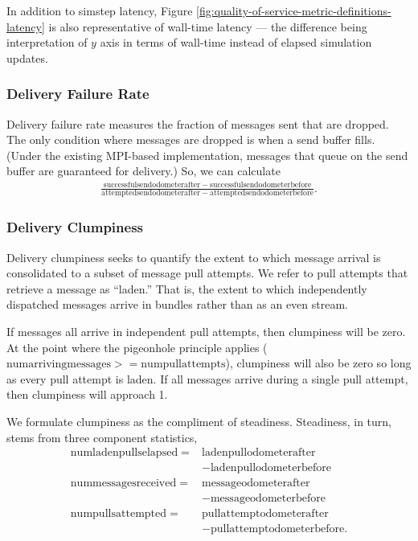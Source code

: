 In addition to simstep latency, Figure \ref{fig:quality-of-service-metric-definitions-latency} is also representative of wall-time latency --- the difference being interpretation of $y$ axis in terms of wall-time instead of elapsed simulation updates.

\subsubsection{Delivery Failure Rate} \label{sec:delivery-failure-rate-metric}

Delivery failure rate measures the fraction of messages sent that are dropped.
The only condition where messages are dropped is when a send buffer fills.
(Under the existing MPI-based implementation, messages that queue on the send buffer are guaranteed for delivery.)
So, we can calculate
\begin{align*}
  \frac{
    \mathrm{successful send odometer after} - \mathrm{successful send odometer before}
  }{
    \mathrm{attempted send odometer after} - \mathrm{attempted send odometer before}
  }.
\end{align*}

\subsubsection{Delivery Clumpiness} \label{sec:delivery-clumpiness-metric}

Delivery clumpiness seeks to quantify the extent to which message arrival is consolidated to a subset of message pull attempts.
We refer to pull attempts that retrieve a message as ``laden.''
That is, the extent to which independently dispatched messages arrive in bundles rather than as an even stream.

If messages all arrive in independent pull attempts, then clumpiness will be zero.
At the point where the pigeonhole principle applies ($\mathrm{num arriving messages} >= \mathrm{num pull attempts}$), clumpiness will also be zero so long as every pull attempt is laden.
If all messages arrive during a single pull attempt, then clumpiness will approach 1.

We formulate clumpiness as the compliment of steadiness.
Steadiness, in turn, stems from three component statistics,
\begin{align*}
\mathrm{num laden pulls elapsed} =& \mathrm{laden pull odometer after} \\
  &- \mathrm{laden pull odometer before} \\
\mathrm{num messages received} =& \mathrm{message odometer after} \\
  &- \mathrm{message odometer before} \\
\mathrm{num pulls attempted} =& \mathrm{pull attempt odometer after} \\
  &- \mathrm{pull attempt odometer before}
.
\end{align*}


